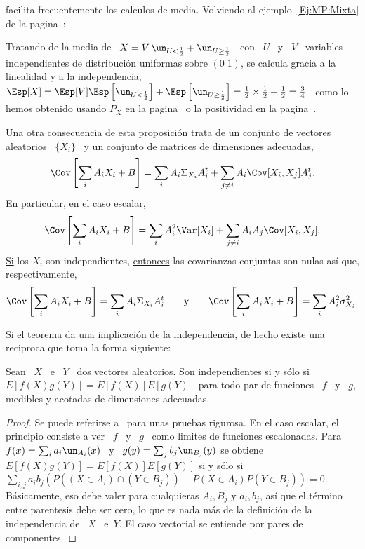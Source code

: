   facilita
frecuentemente los calculos de media.  Volviendo al ejemplo~\ref{Ej:MP:Mixta} de
la pagina~\pageref{Ej:MP:Mixta}:
%
\begin{ejemplo}
\label{Ej:EspMixtaInd}
%
Tratando de la media  de \ $X = V \, \un_{U < \frac12}  + \un_{U \ge \frac12}$ \
con \ $U$ \ y \ $V$ \ variables independientes de distribuci\'on uniformas sobre
$(0 \; 1)$, se calcula gracia a la linealidad y a la independencia, \ $\Esp[X] =
\Esp[V] \Esp\left[  \un_{U < \frac12}  \right] + \Esp\left[ \un_{U  \ge \frac12}
\right] = \frac12  \times \frac12 + \frac12 = \frac34$ \  como lo hemos obtenido
usando  $P_X$  en la  pagina~\pageref{Ej:MP:EspMixta}  o  la  positividad en  la
pagina~\pageref{Ej:MP:EspMixtaPositiva}.
\end{ejemplo}

Una otra  consecuencia de  esta proposici\'on trata  de un conjunto  de vectores
aleatorios \ $\{ X_i \}$ \ y un conjunto de matrices de dimensiones adecuadas,
%
\[
\Cov\left[ \sum_i A_i X_i + B\right] =  \sum_i A_i \Sigma_{X_i} A_i^t + \sum_{j \ne
  i} A_i \Cov[X_i,X_j] A_j^t.
\]
%
En particular, en el caso escalar,
%
\[
\Cov\left[ \sum_i A_i X_i + B \right]  = \sum_i A_i^2 \Var[X_i] + \sum_{j \ne i}
A_i A_j \Cov[X_i,X_j].
\]
%
\underline{Si}   los   $X_i$   son  independientes,   \underline{entonces}   las
covarianzas conjuntas son nulas as\'i que, respectivamente,
%
\[
\Cov\left[ \sum_i  A_i X_i +  B \right] =  \sum_i A_i \Sigma_{X_i}  A_i^t \qquad
\mbox{y}  \qquad  \Cov\left[  \sum_i  A_i   X_i  +  B  \right]  =  \sum_i  A_i^2
\sigma_{X_i}^2.
\]

Si el  teorema da  una implicaci\'on  de la independencia,  de hecho  existe una
reciproca que toma la forma siguiente:
%
\begin{teorema}
\label{Teo:MP:IndependenciaMomentos}
%
  Sean \ $X$ \ e \ $Y$ \ dos vectores aleatorios. Son independientes si y s\'olo
  si $E[f(X) g(Y)]=E[f(X)] E[g(Y)]$ para todo par  de funciones \ $f$ \ y \ $g$,
  medibles y acotadas de dimensiones adecuadas.
\end{teorema}
%
\begin{proof}
  Se puede referirse a~\cite{Fel71, JacPro03} para unas pruebas rigurosa.  En el
  caso escalar, el  principio consiste a ver \  $f$ \ y \ $g$ \  como limites de
  funciones escalonadas. Para  \ $f(x) = \sum_i a_i \un_{A_i}(x)$ \  y \ $g(y) =
  \sum_j b_j \un_{B_j}(y)$ se obtiene $E[f(X) g(Y)]=E[f(X)] E[g(Y)]$ si y s\'olo
  si $\sum_{i,j} a_i b_j \left( P( (X \in  A_i) \cap (Y \in B_j)) - P(X \in A_i)
    P(Y \in  B_j) \right) = 0$.  B\'asicamente, eso debe  valer para cualquieras
  $A_i, B_j$  y $a_i,  b_j$, as\'i  que el t\'ermino  entre parentesis  debe ser
  cero, lo que es  nada m\'as de la definici\'on de la  independencia de \ $X$ \
  e\ $Y$.  El caso vectorial se entiende por pares de componentes.
\end{proof}

